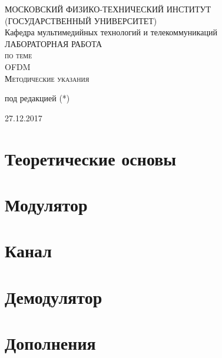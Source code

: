 \documentclass[a4paper,12pt]{article}
\begin{document}
\begin{titlepage}
  \begin{center}
    \large
    МОСКОВСКИЙ ФИЗИКО-ТЕХНИЧЕСКИЙ ИНСТИТУТ\\ (ГОСУДАРСТВЕННЫЙ УНИВЕРСИТЕТ)\\[60mm]
   
    
 
    Кафедра мультимедийных технологий и телекоммуникаций\\[5mm]
 
    \textsc{ЛАБОРАТОРНАЯ РАБОТА \\ по теме  }\\[5mm]
     
    {\LARGE OFDM}\\[6mm]
     \textsc{Методические указания }\\[100mm]
  \bigskip
     
      
\begin{center}

  под редакцией (*)

\end{center}
    
\end{center}

 


 
\begin{center}

 27.12.2017

\end{center}
\end{titlepage}

\section{Теоретические основы}
\section{Модулятор}
\section{Канал}

\section{Демодулятор}

\section{Дополнения}
\end{document}
